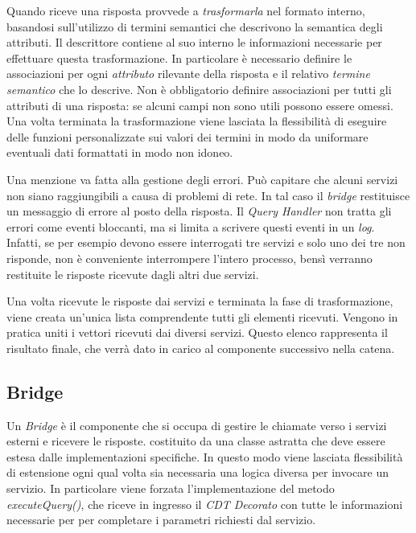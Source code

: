 Quando riceve una risposta provvede a \emph{trasformarla} nel formato interno, basandosi sull'utilizzo di termini semantici che descrivono la semantica degli attributi. Il descrittore contiene al suo interno le informazioni necessarie per effettuare questa trasformazione. In particolare è necessario definire le associazioni per ogni \emph{attributo} rilevante della risposta e il relativo \emph{termine semantico} che lo descrive. Non è obbligatorio definire associazioni per tutti gli attributi di una risposta: se alcuni campi non sono utili possono essere omessi. Una volta terminata la trasformazione viene lasciata la flessibilità di eseguire delle funzioni personalizzate sui valori dei termini in modo da uniformare eventuali dati formattati in modo non idoneo.

Una menzione va fatta alla gestione degli errori. Può capitare che alcuni servizi non siano raggiungibili a causa di problemi di rete. In tal caso il \emph{bridge} restituisce un messaggio di errore al posto della risposta. Il \emph{Query Handler} non tratta gli errori come eventi bloccanti, ma si limita a scrivere questi eventi in un \emph{log}. Infatti, se per esempio devono essere interrogati tre servizi e solo uno dei tre non risponde, non è conveniente interrompere l'intero processo, bensì verranno restituite le risposte ricevute dagli altri due servizi.

Una volta ricevute le risposte dai servizi e terminata la fase di trasformazione, viene creata un'unica lista comprendente tutti gli elementi ricevuti. Vengono in pratica uniti i vettori ricevuti dai diversi servizi. Questo elenco rappresenta il risultato finale, che verrà dato in carico al componente successivo nella catena.

\subsection{Bridge\label{sec:bridge}}

Un \emph{Bridge} è il componente che si occupa di gestire le chiamate verso i servizi esterni e ricevere le risposte. \upe costituito da una classe astratta che deve essere estesa dalle implementazioni specifiche. In questo modo viene lasciata flessibilità di estensione ogni qual volta sia necessaria una logica diversa per invocare un servizio. In particolare viene forzata l'implementazione del metodo \emph{executeQuery()}, che riceve in ingresso il \emph{CDT Decorato} con tutte le informazioni necessarie per per completare i parametri richiesti dal servizio.

